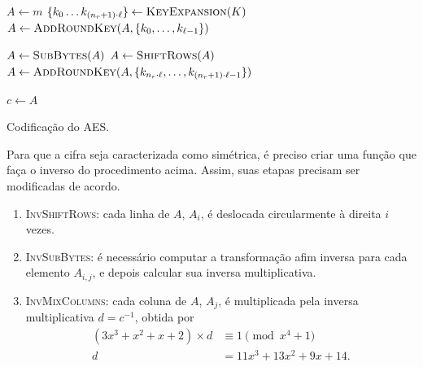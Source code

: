\documentclass{ufsctex/ufsctex}
\begin{document}
\begin{algorithm}
  \vspace{2mm}

  $A \leftarrow m$\;
  $\{k_{0} \dots k_{(n_r + 1) \cdot \ell}\}
    \leftarrow \textsc{KeyExpansion}(K)$\;
  $A \leftarrow \textsc{AddRoundKey}(A,
    \{k_{0}, \dots, k_{\ell - 1}\})$\;


  $A \leftarrow \textsc{SubBytes}(A)$\;
  $A \leftarrow \textsc{ShiftRows}(A)$\;
  $A \leftarrow \textsc{AddRoundKey}(A,
    \{k_{n_r \cdot \ell}, \dots, k_{(n_r + 1) \cdot \ell - 1}\})$\;

  $c \leftarrow A$\;

  \vspace{2mm}
  \caption{Codificação do AES.}\label{alg:1}
\end{algorithm}

Para que a cifra seja caracterizada como simétrica, é preciso criar uma função
que faça o inverso do procedimento acima. Assim, suas etapas precisam ser
modificadas de acordo.

\begin{enumerate}[label=\roman*.]

  \item \textsc{InvShiftRows}: cada linha de $A$, $A_i$, é deslocada
      circularmente à direita $i$ vezes.

  \item \textsc{InvSubBytes}: é necessário computar a transformação afim
      inversa para cada elemento $A_{i, j}$, e depois calcular sua inversa
        multiplicativa.

  \item \textsc{InvMixColumns}: cada coluna de $A$, $A_j$, é multiplicada pela
      inversa multiplicativa $d = c^{-1}$, obtida por
        \begin{equation}
          \begin{align}
            (3 x^{3} + x^{2} + x + 2) \times d &\equiv 1 \pmod{x^{4} + 1} \\
            d &= 11 x^{3} + 13 x^{2} + 9 x + 14.
          \end{align}
        \end{equation}

\end{enumerate}
\end{document}
